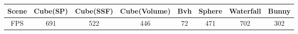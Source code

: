 \begin{tabular}{cccccccc}
    \toprule
    Scene & Cube(SP)& Cube(SSF)& Cube(Volume)& Bvh & Sphere& Waterfall& Bunny\\
    \midrule
    FPS & 691& 522& 446& 72& 471& 702& 302\\
    \bottomrule
\end{tabular}